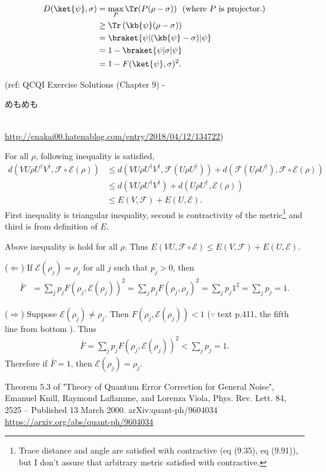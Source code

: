 \begin{align*}
    D(\ket{\psi}, \sigma) &= \max_P \Tr (P (\rho - \sigma)) ~~(\text{where } P \text{ is projector.})\\
        &\geq \Tr \left(\kb{\psi} (\rho - \sigma)\right)\\
        &= \braket{\psi | (\kb{\psi} - \sigma) | \psi}\\
        &= 1 - \braket{\psi | \sigma | \psi}\\
        &= 1 - F(\ket{\psi}, \sigma)^2.
\end{align*}

(ref: QCQI Exercise Solutions (Chapter 9) - \begin{CJK}{UTF8}{ipxm}めもめも\end{CJK} \\ \url{http://enakai00.hatenablog.com/entry/2018/04/12/134722})

For all $\rho$, following inequality is satisfied,
\begin{align*}
        d(VU \rho U^\dagger V^\dagger, \mathcal{F} \circ \mathcal{E}(\rho))
        &\leq d(VU \rho U^\dagger V^\dagger, \mathcal{F}(U\rho U^\dagger)) + d(\mathcal{F}(U\rho U^\dagger), \mathcal{F}\circ \mathcal{E}(\rho)) \\
        &\leq d(VU \rho U^\dagger V^\dagger) + d(U\rho U^\dagger, \mathcal{E}(\rho))\\
        &\leq E(V, \mathcal{F})+ E(U, \mathcal{E}).
\end{align*}
First inequality is triangular inequality, second is contractivity of the metric\footnote{Trace distance and angle are satisfied with contractive (eq (9.35), eq (9.91)), but I don't assure that arbitrary metric satisfied with contractive. }
and third is from definition of $E$.

Above inequality is hold for all $\rho$. Thus $E(VU, \mathcal{F} \circ \mathcal{E}) \leq E(V, \mathcal{F})+ E(U, \mathcal{E})$.

($\Leftarrow$)
If $\mathcal{E}(\rho_j) = \rho_j$ for all $j$ such that $p_j > 0$, then
\begin{align*}
    \bar{F} &= \sum_j p_j F(\rho_j, \mathcal{E}(\rho_j))^2 = \sum_j p_j F(\rho_j, \rho_j)^2 = \sum_j p_j 1^2 = \sum_j p_j = 1.
\end{align*}

($\Rightarrow$) Suppose $\mathcal{E}(\rho_j) \neq \rho_j$.  Then $F(\rho_j, \mathcal{E}(\rho_j)) < 1$ ($\because$  text p.411, the fifth line from bottom ).
Thus
\begin{align*}
    \bar{F} = \sum_j p_j F(\rho_j, \mathcal{E}(\rho_j))^2 < \sum_j p_j = 1.
\end{align*}
Therefore if $\bar{F} = 1$, then $\mathcal{E}(\rho_j) = \rho_j$.



Theorem 5.3 of
"Theory of Quantum Error Correction for General Noise",
Emanuel Knill, Raymond Laflamme, and Lorenza Viola,
Phys. Rev. Lett. 84, 2525 – Published 13 March 2000.
arXiv:quant-ph/9604034
\url{https://arxiv.org/abs/quant-ph/9604034}
